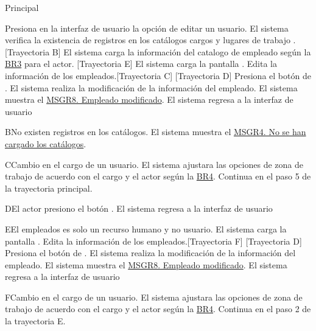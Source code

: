 \begin{UCtrayectoria}{Principal}
    
    \UCpaso[\UCactor] Presiona en la interfaz de usuario  la opción de editar un usuario. 
    \UCpaso  El sistema verifica la existencia de registros en los catálogos cargos  y  lugares de trabajo . [Trayectoria B] 
    \UCpaso El sistema carga la información del catalogo de empleado  según la \hyperlink{reglas-BR3}{BR3} para el actor. [Trayectoria E]
    \UCpaso El sistema carga la pantalla  .
    \UCpaso[\UCactor] Edita la información de los empleados.[Trayectoria C] [Trayectoria D] 
    \UCpaso[\UCactor]  Presiona el botón de .
    \UCpaso El sistema realiza la modificación de la información del empleado.
    \UCpaso  El sistema muestra el \hyperref[MSGR8]{MSGR8. Empleado modificado}.    
    \UCpaso El sistema regresa a la interfaz de usuario 
\end{UCtrayectoria}

\begin{UCtrayectoriaA}{B}{No existen registros en los catálogos.}
    \UCpaso     El sistema muestra el \hyperref[MSGR4]{MSGR4. No se han cargado los catálogos}.
\end{UCtrayectoriaA}

\begin{UCtrayectoriaA}{C}{Cambio en el cargo de un usuario.}
    \UCpaso     El sistema ajustara las opciones de zona de trabajo de acuerdo con el cargo y el actor según la \hyperlink{reglas-BR4}{BR4}.
    \UCpaso     Continua en el paso 5 de la trayectoria principal.
\end{UCtrayectoriaA}

\begin{UCtrayectoriaA}{D}{El actor presiono el botón .}
 \UCpaso El sistema regresa a la interfaz de usuario 
\end{UCtrayectoriaA}
\begin{UCtrayectoriaA}{E}{El empleados es solo un recurso humano y no usuario.}
 \UCpaso El sistema carga la pantalla  .
    \UCpaso[\UCactor] Edita la información de los empleados.[Trayectoria F] [Trayectoria D] 
    \UCpaso[\UCactor]  Presiona el botón de .
    \UCpaso El sistema realiza la modificación de la información del empleado.
    \UCpaso  El sistema muestra el \hyperref[MSGR8]{MSGR8. Empleado modificado}.    
    \UCpaso El sistema regresa a la interfaz de usuario 
\end{UCtrayectoriaA}
\begin{UCtrayectoriaA}{F}{Cambio en el cargo de un usuario.}
    \UCpaso     El sistema ajustara las opciones de zona de trabajo de acuerdo con el cargo y el actor según la \hyperlink{reglas-BR4}{BR4}.
    \UCpaso     Continua en el paso 2 de la trayectoria E.
\end{UCtrayectoriaA}